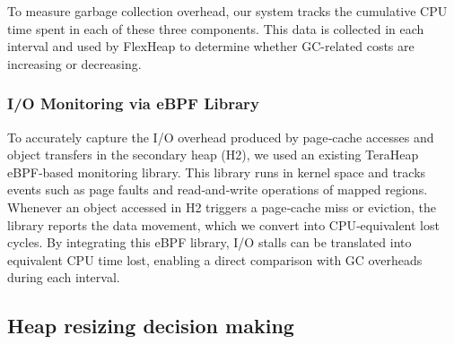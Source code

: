 %
%

To measure garbage collection overhead, our system tracks the cumulative CPU time spent in each of these three components.
This data is collected in each interval and used by FlexHeap to determine whether GC-related costs are increasing or decreasing.

\subsubsection{I/O Monitoring via eBPF Library}  %

To accurately capture the I/O overhead produced by page‑cache accesses and
object transfers in the secondary heap (H2), we used an existing TeraHeap
eBPF‑based monitoring library. This library runs in kernel space and tracks
events such as page faults and read‑and‑write operations of mapped regions.
Whenever an object accessed in H2 triggers a page‑cache miss or eviction, the
library reports the data movement, which we convert into CPU‑equivalent lost
cycles. By integrating this eBPF library, I/O stalls can be translated into
equivalent CPU time lost, enabling a direct comparison with GC overheads during
each interval.

\subsection{Heap resizing decision making} %





